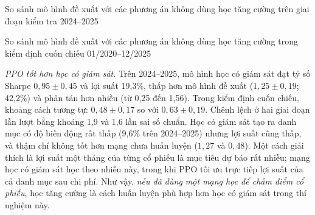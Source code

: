 \begin{table}[ht]
\centering\footnotesize
\setlength{\tabcolsep}{3.5pt}
\caption{So sánh mô hình đề xuất với các phương án không dùng học tăng cường trên giai đoạn kiểm tra 2024--2025}
\label{tab:norltest}
\begin{adjustbox}{max width=\textwidth}\end{adjustbox}
\end{table}

\begin{table}[ht]
\centering\footnotesize
\setlength{\tabcolsep}{3.5pt}
\caption{So sánh mô hình đề xuất với các phương án không dùng học tăng cường trong kiểm định cuốn chiếu 01/2020--12/2025}
\label{tab:norlwf}
\begin{adjustbox}{max width=\textwidth}\end{adjustbox}
\end{table}

\textit{PPO tốt hơn học có giám sát.} Trên 2024--2025, mô hình học có giám sát đạt tỷ số Sharpe $0{,}95\pm0{,}45$ và lợi suất 19,3\%, thấp hơn mô hình đề xuất ($1{,}25\pm0{,}19$; 42,2\%) và phân tán hơn nhiều (từ 0,25 đến 1,56). Trong kiểm định cuốn chiếu, khoảng cách tương tự: $0{,}48\pm0{,}17$ so với $0{,}63\pm0{,}19$. Chênh lệch ở hai giai đoạn lần lượt bằng khoảng 1,9 và 1,6 lần sai số chuẩn. Học có giám sát tạo ra danh mục có độ biến động rất thấp (9,6\% trên 2024--2025) nhưng lợi suất cũng thấp, và thậm chí không tốt hơn mạng chưa huấn luyện ($1{,}27$ và $0{,}48$). Một cách giải thích là lợi suất một tháng của từng cổ phiếu là mục tiêu dự báo rất nhiễu; mạng học có giám sát học theo nhiễu này, trong khi PPO tối ưu trực tiếp lợi suất của cả danh mục sau chi phí. Như vậy, \emph{nếu đã dùng một mạng học để chấm điểm cổ phiếu}, học tăng cường là cách huấn luyện phù hợp hơn học có giám sát trong thí nghiệm này.


